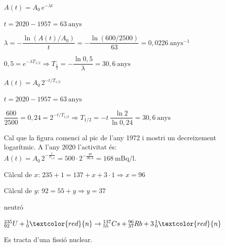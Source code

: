 \begin{solapartat}
 $A(t) = A_0\,e^{-\lambda t}$

 $t = 2020 - 1957 = 63\ \text{anys}$

 $\lambda = -\dfrac{\ln(A(t)/A_0)}{t} = -\dfrac{\ln(600/2500)}{63} = 0,0226\ \text{anys}^{-1}$

 $0,5 = e^{-\lambda T_{1/2}} \Longrightarrow T_{\frac{1}{2}} = -\dfrac{\ln 0,5}{\lambda} = 30,6\ \text{anys}$


 $A(t) = A_0\,2^{-t/T_{1/2}}$

 $t = 2020 - 1957 = 63\ \text{anys}$

 $\dfrac{600}{2500} = 0,24 = 2^{-t/T_{1/2}} \Longrightarrow T_{1/2} = -t\,\dfrac{\ln 2}{\ln 0,24} = 30,6\ \text{anys}$

Cal que la figura comenci al pic de l'any 1972 i mostri un decreixement logarítmic. A l'any 2020 l'activitat és: $A(t) = A_0\,2^{-\frac{t}{T_{1/2}}} = 500\cdot 2^{-\frac{48}{30,6}} = 168\ \mathrm{mBq/l}$.
\end{solapartat}

\begin{solapartat}
 Càlcul de $x$: $235 + 1 = 137 + x + 3\cdot 1 \Rightarrow x = 96$

 Càlcul de $y$: $92 = 55 + y \Rightarrow y = 37$

 neutró

${}^{235}_{92}U + {}^{1}_{0}\textcolor{red}{n} \rightarrow {}^{137}_{55}Cs + {}^{96}_{37}Rb + 3\,{}^{1}_{0}\textcolor{red}{n}$

 Es tracta d'una fissió nuclear.
\end{solapartat}
